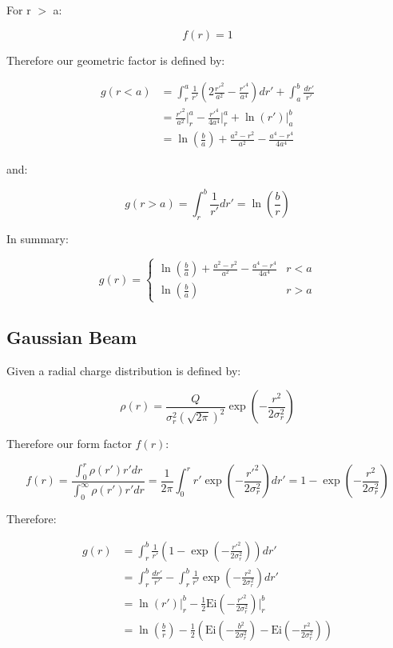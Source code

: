 For r $>$ a:

$$f(r) = 1$$

Therefore our geometric factor is defined by:

$$\begin{aligned}
        g(r<a) & = \int_r^a \frac{1}{r'}\left(2\frac{r'^2}{a^2}-\frac{r'^4}{a^4}\right)dr'+ \int_a^b\frac{dr'}{r'} \\
               & =\frac{r'^2}{a^2}\Big|_r^a-\frac{r'^4}{4a^4}\Big|_r^a + \ln\left(r'\right)\Big|_a^b               \\
               & = \ln\left(\frac{b}{a}\right) + \frac{a^2-r^2}{a^2} - \frac{a^4-r^4}{4a^4}
    \end{aligned}$$

and:

$$g(r>a) = \int_r^b\frac{1}{r'}dr' = \ln\left(\frac{b}{r}\right)$$

In summary:

\begin{equation}
    g(r) = \begin{cases}
        \ln\left(\frac{b}{a}\right)+\frac{a^2-r^2}{a^2}-\frac{a^4-r^4}{4a^4} & r < a \\
        \ln(\frac{b}{a})                                                     & r > a\end{cases}
    \label{eq:g_parabolic}
\end{equation}
\subsection{Gaussian Beam}

Given a radial charge distribution is defined by:

$$\rho(r) = \frac{Q}{\sigma_r^2(\sqrt{2\pi})^2}\exp\left(-\frac{r^2}{2\sigma_r^2}\right)$$

Therefore our form factor $f(r)$:

$$f(r) = \frac{\int_0^r\rho(r')r'dr}{\int_0^\infty \rho(r')r'dr} = \frac{1}{2\pi}\int_0^r r'\exp\left(-\frac{r'^2}{2\sigma_r^2}\right)dr' = 1-\exp\left(-\frac{r^2}{2\sigma_r^2}\right)$$

Therefore:

$$\begin{aligned}
        g(r) & = \int_r^b\frac{1}{r'}\left(1-\exp\left(-\frac{r'^2}{2\sigma_r^2}\right)\right)dr'                                            \\
             & =\int_r^b\frac{dr'}{r'} -\int_r^b\frac{1}{r'}\exp\left(-\frac{r^2}{2\sigma_r^2}\right)dr'                                     \\
             & = \ln(r')\Big|_r^b -\frac{1}{2}\text{Ei}\left(-\frac{r'^2}{2\sigma_r^2}\right)\Big|_r^b                                       \\
             & = \ln\left(\frac{b}{r}\right)-\frac{1}{2}\left(\text{Ei}(-\frac{b^2}{2\sigma_r^2})-\text{Ei}(-\frac{r^2}{2\sigma_r^2})\right)
    \end{aligned}$$


